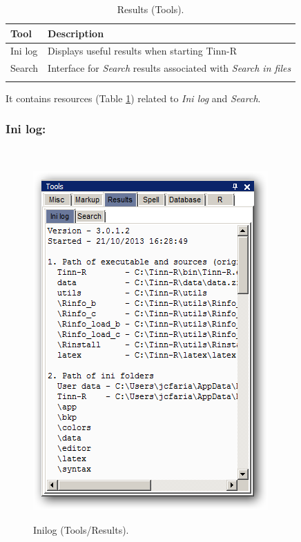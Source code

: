\begin{table}
  \begin{footnotesize}
    \begin{tabularx}{\textwidth}{>{\hsize=0.3\hsize}X>{\hsize=0.7\hsize}X}\\
      \hline
      \textbf{Tool} & \textbf{Description} \\
      \hline
      Ini log & Displays useful results when starting Tinn-R \\
      Search & Interface for \textit{Search} results associated with \textit{Search in files} \\
      \hline
      \\
    \end{tabularx}
  \end{footnotesize}
  \caption{Results (Tools).}
  \label{tab:tools_results}
\end{table}

It contains resources
(Table \ref{tab:tools_results})
related to \textit{Ini log} and \textit{Search}.


\subsubsection{Ini log:}
\\

\begin{figure}[h!]
  \includegraphics[scale=0.35]{./res/tools_results_inilog.png}\\
  \caption{Inilog (Tools/Results).}
  \label{fig:tools_results_inilog}
\end{figure}

